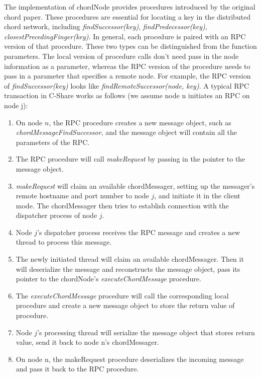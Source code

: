 \documentclass[letterpaper,twocolumn,10pt]{article}
\begin{document}
The implementation of chordNode provides procedures introduced by the original chord paper. These procedures are essential for locating a key in the distributed chord network, including \textit{findSuccessor(key)},  \textit{findPredecessor(key)}, \textit{closestPrecedingFinger(key)}. In general, each procedure is paired with an RPC version of that procedure. These two types can be distinguished from the function parameters. The local version of procedure calls don't need pass in the node information as a parameter, whereas the RPC version of the procedure needs to pass in a parameter that specifies a remote node.  For example, the RPC version of \textit{findSuccessor(key)} looks like \textit{findRemoteSuccessor(node, key)}. A typical RPC transaction in C-Share works as follows (we assume node n initiates an RPC on node j):
\begin{enumerate}
	\item On node $n$, the RPC procedure creates a new message object, such as \textit{chordMessageFindSuccessor}, and the message object will contain all the parameters of the RPC.
	\item The RPC procedure will call \textit{makeRequest} by passing in the pointer to the message object.
	\item  \textit{makeRequest} will claim an available chordMessager, setting up the messager's remote hostname and port number to node $j$, and initiate it in the client mode. The chordMessager then tries to establish connection with the dispatcher process of node $j$.
	\item Node $j$'s dispatcher process receives the RPC message and creates a new thread to process this message.
	\item The newly initiated thread will claim an available chordMessager. Then it will deserialize the message and reconstructs the message object, pass its pointer to the chordNode's \textit{executeChordMessage} procedure.
	\item  The \textit{executeChordMessage} procedure will call the corresponding local procedure and create a new message object to store the return value of procedure.
	\item Node $j$'s processing thread will serialize the message object that stores return value, send it back to node n's chordMessager.
	\item On node n, the makeRequest procedure deserializes the incoming message and pass it back to the RPC procedure.

\end{enumerate}
\end{document}
